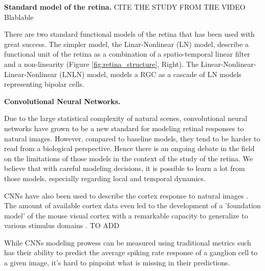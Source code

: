 \textbf{Standard model of the retina.}
CITE THE STUDY FROM THE VIDEO Blablable

There are two standard functional models of the retina that has been used with
great success. The simpler model, the Linar-Nonlinear (LN) model, describe a
functional unit
of the retina as a combination of a spatio-temporal linear filter and a
non-linearity (Figure \ref{fig:retina_structure}, Right).
The Linear-Nonlinear-Linear-Nonlinear (LNLN) model, models a RGC as a cascade
of LN models representing bipolar cells.

\textbf{Convolutional Neural Networks.}

Due to the large statistical complexity of natural scenes, convolutional neural
networks have grown to be a new standard for modeling retinal responses to
natural images. However, compared to baseline models, they tend to be harder to
read from a biological perspective. Hence there is an ongoing debate in the
field on the limitations of those models in the context of the study of the
retina. We believe that with careful modeling decisions, it is possible to
learn a lot from those models, especially regarding local and temporal
dynamics.

CNNs have also been used to describe the cortex response to natural images
\citep{cadena_deep_2019}. The amount of available cortex data even led to the
development of a 'foundation model' of the mouse visual cortex with a
remarkable capacity to generalize to various stimulus domains \cite{wang}. TO
ADD

While CNNs modeling prowess can be measured using traditional metrics such has
their ability to predict the average spiking rate response of a ganglion cell
to a given image, it's hard to pinpoint what is missing in their predictions.